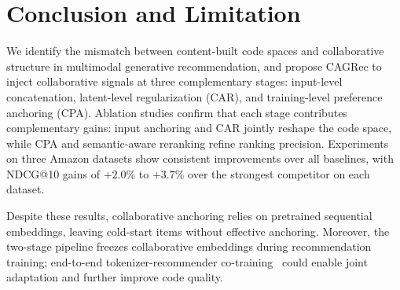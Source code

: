 \documentclass[sigconf, anonymous, review]{acmart}
\begin{document}

\section{Conclusion and Limitation}

We identify the mismatch between content-built code spaces and collaborative structure in multimodal generative recommendation, and propose CAGRec to inject collaborative signals at three complementary stages: input-level concatenation, latent-level regularization (CAR), and training-level preference anchoring (CPA).
%
Ablation studies confirm that each stage contributes complementary gains: input anchoring and CAR jointly reshape the code space, while CPA and semantic-aware reranking refine ranking precision.
% 
Experiments on three Amazon datasets show consistent improvements over all baselines, with NDCG@10 gains of $+2.0\%$ to $+3.7\%$ over the strongest competitor on each dataset.

Despite these results, collaborative anchoring relies on pretrained sequential embeddings, leaving cold-start items without effective anchoring.
%
Moreover, the two-stage pipeline freezes collaborative embeddings during recommendation training; end-to-end tokenizer-recommender co-training~\cite{etegrec} could enable joint adaptation and further improve code quality.




\end{document}
